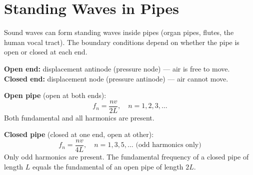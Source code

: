 \begin{diagbox}
\begin{center}
\end{center}
\end{diagbox}

\section{Standing Waves in Pipes}

Sound waves can form standing waves inside pipes
(organ pipes, flutes, the human vocal tract).
The boundary conditions depend on whether the pipe
is open or closed at each end.

\textbf{Open end:} displacement antinode
(pressure node) --- air is free to move.\\
\textbf{Closed end:} displacement node
(pressure antinode) --- air cannot move.

\begin{lawbox}
\textbf{Open pipe} (open at both ends):
\[
  f_n = \frac{nv}{2L}, \quad n = 1, 2, 3, \ldots
\]
Both fundamental and all harmonics are present.

\vspace{0.4cm}

\textbf{Closed pipe} (closed at one end, open at other):
\[
  f_n = \frac{nv}{4L}, \quad n = 1, 3, 5, \ldots
  \text{ (odd harmonics only)}
\]
Only odd harmonics are present.
The fundamental frequency of a closed pipe of
length $L$ equals the fundamental of an open pipe
of length $2L$.
\end{lawbox}

